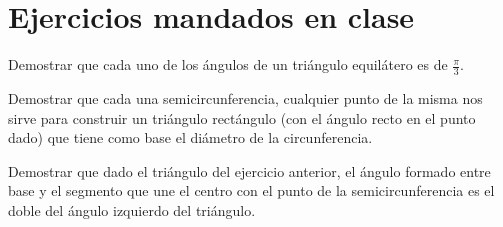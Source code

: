 \section{Ejercicios mandados en clase}
\begin{problem}[1]
Demostrar que cada uno de los ángulos de un triángulo equilátero es de $\frac{π}{3}$.
\solution
\end{problem}

\begin{problem}[2]
Demostrar que cada una semicircunferencia, cualquier punto de la misma nos sirve para construir un triángulo rectángulo (con el ángulo recto en el punto dado) que tiene como base el diámetro de la circunferencia.
\solution
\end{problem}

\begin{problem}[3]
Demostrar que dado el triángulo del ejercicio anterior, el ángulo formado entre base y el segmento que une el centro con el punto de la semicircunferencia es el doble del ángulo izquierdo del triángulo.
\solution
\end{problem}

